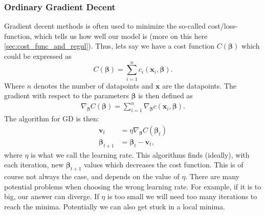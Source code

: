 \documentclass[12pt]{extarticle}
\begin{document}
\subsubsection{Ordinary Gradient Decent}
Gradient decent methods is often used to minimize the so-called cost/loss-function, which tells us how well our model is (more on this here \ref{sec:cost_func_and_regul}). Thus, lets say we have a cost function $C(\boldsymbol{\beta})$ which could be expressed as
\begin{equation}
C(\boldsymbol{\beta}) = \sum_{i = 1}^{n}c_i(\mathbf{x}_i, \boldsymbol{\beta}).
\end{equation}
Where $n$ denotes the number of datapoints and $\mathbf x$ are the datapoints. The gradient with respect to the parameters $\boldsymbol{\beta}$ is then defined as
\begin{align}
\nabla_{\boldsymbol{\beta}} C(\boldsymbol{\beta}) = \sum_{i = 1}^{n} \nabla_{\boldsymbol{\beta}} c(\mathbf{x}_i, \boldsymbol{\beta}).
\label{eq:Total_gradient}
\end{align}
The algorithm for GD is then:
\begin{align}
\mathbf{v}_t &= \eta \nabla_{\boldsymbol{\beta}} C(\boldsymbol{\beta}_t) \nonumber \\
\boldsymbol{\beta}_{t+1} &= \boldsymbol{\beta}_t - \mathbf{v}_t,
\label{eq:GD_algo}
\end{align}
where $\eta$ is what we call the learning rate. This algorithms finds (ideally), with each iteration, new $\boldsymbol{\beta}_{t+1}$ values which decreases the cost function. This is of course not always the case, and depends on the value of $\eta$. There are many potential problems when choosing the wrong learning rate. For example, if it is to big, our answer can diverge. If $\eta$ is too small we will need too many iterations to reach the minima. Potentially we can also get stuck in a local minima.
\end{document}
